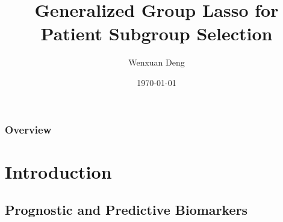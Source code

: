 \documentclass{beamer}
\title[Patient Subgroup Selection]{Generalized Group Lasso for Patient Subgroup Selection} %
\author{Wenxuan Deng} %
\institute[Takeda] %
    {
    Takeda Pharmaceuticals U.S.A., Inc. \\ %
    \medskip
    \textit{Wenxuan.Deng@takeda.com} %
    }
\date{\today} %
\begin{document}
    
    \begin{frame}
    \titlepage %
    \end{frame}
    
    \begin{frame}
    \frametitle{Overview} %
    \tableofcontents %
    \end{frame}
    
    
    \section{Introduction} %
    
    \subsection{Prognostic and Predictive Biomarkers} %
    
\end{document}
